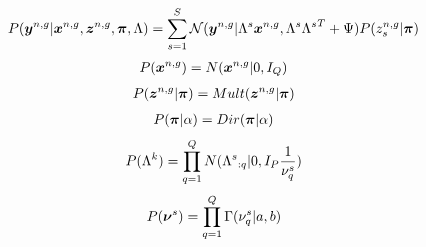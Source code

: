 \documentclass[a4paper]{article}
\begin{document}
\begin{align}
  P(\Xy|\Xx,\Xz,\Xp,\Lambda)=\sum_{s=1}^S\mathcal{N}(\Xy|\Xl\Xx,\Xc+\Xe)P(z_s^{n,g}|\Xp)
\end{align}
\begin{align}
  P(\Xx)=N(\Xx|0,I_{Q})
\end{align}
\begin{align}
  P(\Xz|\Xp)=Mult(\Xz|\Xp)
\end{align}
\begin{align}
  P(\Xp|\alpha)=Dir(\Xp|\alpha)
\end{align}
\begin{align}
  P(\Lambda^k)=\prod_{q=1}^Q N({\Xl}_{:q}|0,I_P\frac{1}{\nu_q^{s}})
\end{align}
\begin{align}
  P(\Xn)=\prod_{q=1}^Q\Gamma(\nu_q^s|a,b)
\end{align}
\end{document}
